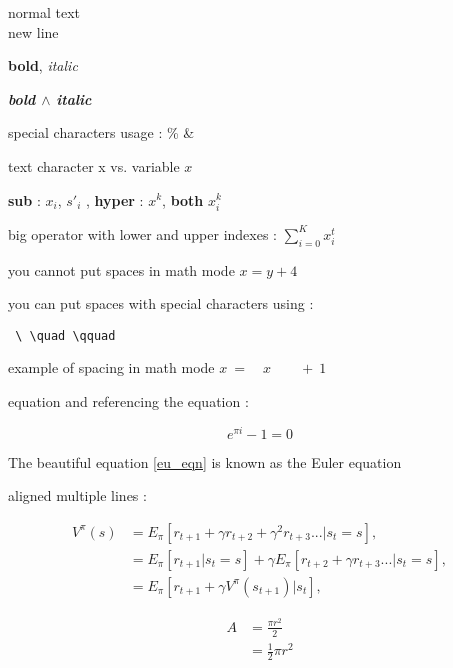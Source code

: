 \documentclass[12pt]{article}
\begin{document}
normal text \\ new line

\textbf{bold}, \textit{italic} 

\textbf{\textit{bold $\wedge$ italic }}

special characters usage : \% \&

text character x vs. variable $x$

\textbf{sub} : $x_i$, $s'_i$ , \textbf{hyper} : $x^k$, \textbf{both} $x_i^k$

\vspace*{20px} %



big operator with lower and upper indexes : $\sum_{i=0}^{K} x_i^t$

you cannot put spaces in math mode $x   =    y   +   4$

you can put spaces with special characters using :
\begin{verbatim}
 \ \quad \qquad 
\end{verbatim}

example of spacing in math mode $ x \ = \quad x \qquad + \ 1$

equation and referencing the equation :


\begin{equation} 
\label{eu_eqn}
e^{\pi i} - 1 = 0
\end{equation}
 
The beautiful equation \ref{eu_eqn} is known as the Euler equation

aligned multiple lines :

\begin{equation}
\label{equation:value2}
\begin{split}
V^{\pi}(s) &= E_{\pi}[r_{t+1} + \gamma r_{t+2} + \gamma^{2}r_{t+3} ... | s_t = s] ,
\\         &= E_{\pi}[r_{t+1} | s_t = s ] + \gamma E_{\pi}[r_{t+2} + \gamma r_{t+3} ... | s_t = s] ,
\\         &= E_{\pi}[r_{t+1} + \gamma V^{\pi}(s_{t+1}) | s_t] , 
\end{split}
\end{equation}

\begin{equation} 
\label{eq1}
\begin{split}
A & = \frac{\pi r^2}{2} \\
 & = \frac{1}{2} \pi r^2
\end{split}
\end{equation}
\end{document}
